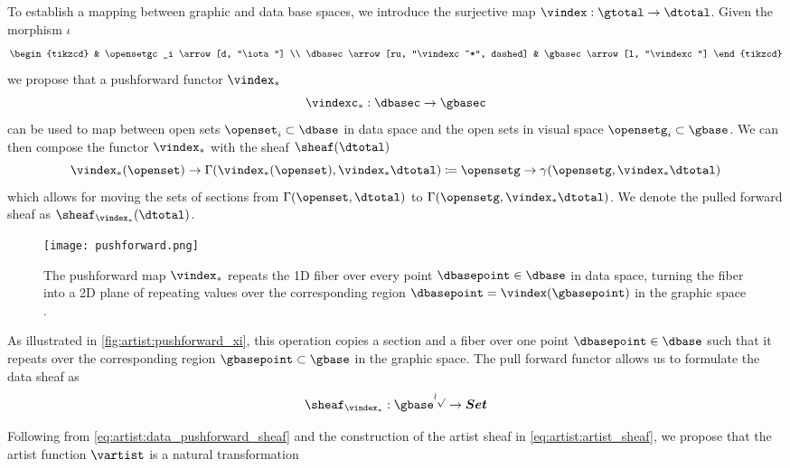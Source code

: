 \documentclass[10pt,journal,compsoc]{IEEEtran}
\theoremstyle{definition}
\theoremstyle{remark}
\begin{document}
To establish a mapping between graphic and data base spaces, we introduce the surjective map $\vindex: \gtotal \rightarrow \dtotal$. Given the morphism $\iota$
\begin{equation}
  \label{eq:artist:vindex}
  \begin{tikzcd}
    & \opensetgc_i \arrow[d, "\iota"] \\
  \dbasec \arrow[ru, "\vindexc^*", dashed] & \gbasec \arrow[l, "\vindexc"]   
\end{tikzcd}
\end{equation}
we propose that a pushforward functor $\vindex_*$ 
\begin{equation}
  \vindexc_{*}:\mathcal{\dbasec} \rightarrow \mathcal{\gbasec}
\end{equation}
can be used to map between open sets $\openset_i \subset \dbase$ in data space and the open sets in visual space $\opensetg_i \subset \gbase$. We can then compose the functor $\vindex_*$ with the sheaf $\sheaf(\dtotal)$ 
\begin{equation*}
\vindex_*(\openset) \rightarrow \Gamma(\vindex_*(\openset), \vindex_* \dtotal) \coloneqq \opensetg \rightarrow \gamma(\opensetg, \vindex_* \dtotal) 
\end{equation*}
which allows for moving the sets of sections from $\Gamma(\openset, \dtotal)$ to $\Gamma(\opensetg, \vindex_* \dtotal)$. We denote the pulled forward sheaf as $\sheaf_{\vindex_*}(\dtotal)$. 

\begin{figure}[h!]
  \texttt{[image: pushforward.png]}
  \label{fig:artist:pushforward_xi}
  \caption{The pushforward map $\vindex_*$ repeats the 1D fiber over every point $\dbasepoint \in \dbase$ in data space, turning the fiber into a 2D plane of repeating values over the corresponding region $\dbasepoint = \vindex(\gbasepoint)$ in the graphic space \gbase. }
\end{figure}

As illustrated in \autoref{fig:artist:pushforward_xi}, this operation copies a section and a fiber over one point $\dbasepoint \in \dbase$ such that it repeats over the corresponding region $\gbasepoint \subset \gbase$ in the graphic space. The pull forward functor allows us to formulate the data sheaf as 
\begin{equation}
  \label{eq:artist:data_pushforward_sheaf}
  \sheaf_{\vindex_*}: \mathcal{\gbase^{op}} \rightarrow \bm{Set}
\end{equation}

Following from \autoref{eq:artist:data_pushforward_sheaf} and the construction of the artist sheaf in \autoref{eq:artist:artist_sheaf}, we propose that the artist function $\vartist$ is a natural transformation
\end{document}

